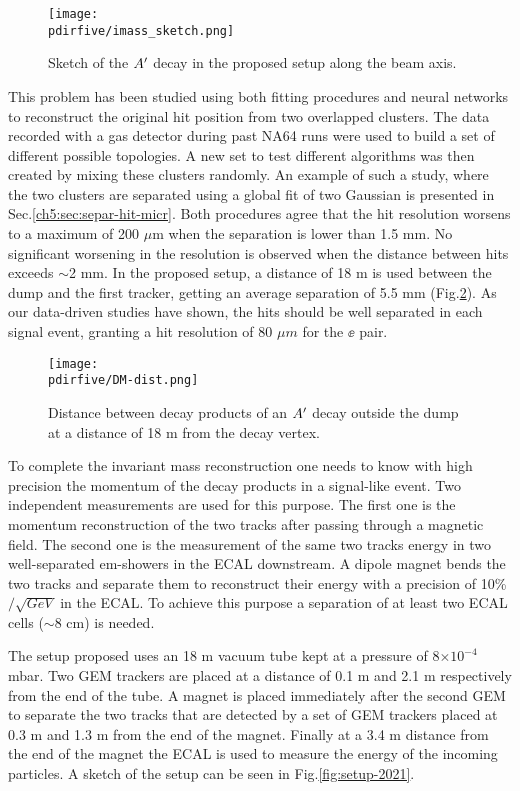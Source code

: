 \begin{figure}[bth!]
  \centering
  \texttt{[image: \\pdirfive/imass\_sketch.png]}
  \caption[Invariant mass reconstruction sketch]{Sketch of the $A'$ decay in the proposed setup along the beam axis.}
  \label{fig:imass_sketch}
\end{figure}


This problem has been studied using both fitting procedures and neural networks to reconstruct the original hit position from two overlapped clusters. The data recorded with a gas detector during past NA64 runs were used to build a set of different possible topologies. A new set to test different algorithms was then created by mixing these clusters randomly. An example of such a study, where the two clusters are separated using a global fit of two Gaussian is presented in Sec.\ref{ch5:sec:separ-hit-micr}. Both procedures agree that the hit resolution worsens to a maximum of 200 $\mu$m when the separation is lower than 1.5 mm. No significant worsening in the resolution is observed when the distance between hits exceeds $\sim$2 mm. In the proposed setup, a distance of 18 m is used between the dump and the first tracker, getting an average separation of 5.5 mm (Fig.\ref{fig:dm_dist1}). As our data-driven studies have shown, the hits should be well separated in each signal event, granting a hit resolution of 80 $\mu m$ for the $\ee$ pair.

\begin{figure}[tbh!]
  \centering
  \texttt{[image: \\pdirfive/DM-dist.png]}
  \caption[Distance of the decay products of X17 in the 2021 setup]{Distance between decay products of an $A'$ decay outside the dump at a distance of 18 m from the decay vertex.}
  \label{fig:dm_dist1}
\end{figure}

To complete the invariant mass reconstruction one needs to know with high precision the momentum of the decay products in a signal-like event. Two independent measurements are used for this purpose. The first one is the momentum reconstruction of the two tracks after passing through a magnetic field. The second one is the measurement of the same two tracks energy in two well-separated em-showers in the ECAL downstream. A dipole magnet bends the two tracks and separate them to reconstruct their energy with a precision of 10\%$/\sqrt{GeV}$ in the ECAL. To achieve this purpose a separation of at least two ECAL cells ($\sim 8$ cm) is needed.

The setup proposed uses an 18 m vacuum tube kept at a pressure of 8$\times 10^{-4}$ mbar. Two GEM trackers \cite{gem} are placed at a distance of 0.1 m and 2.1 m respectively from the end of the tube. A magnet is placed immediately after the second GEM to separate the two tracks that are detected by a set of GEM trackers placed at 0.3 m and 1.3 m from the end of the magnet. Finally at a 3.4 m distance from the end of the magnet the ECAL is used to measure the energy of the incoming particles. A sketch of the setup can be seen in Fig.\ref{fig:setup-2021}.

